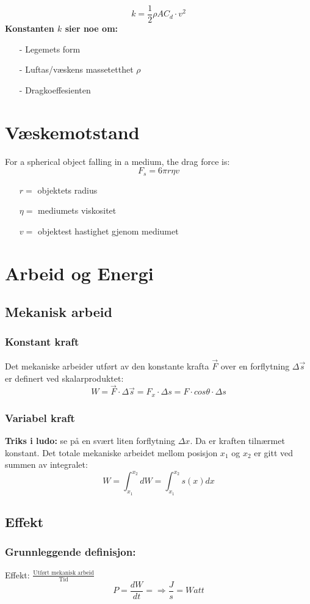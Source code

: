 \documentclass[12pt]{article}
\begin{document}
\bigskip
$$k = \frac{1}{2}\rho AC_d\cdot v^2$$
\textbf{Konstanten $k$ sier noe om:}
\begin{itemize}
    \item[-] Legemets form
    \item[-] Luftas/væskens massetetthet $\rho$
    \item[-] Dragkoeffesienten %
\end{itemize}

\section{Væskemotstand}
For a spherical object falling in a medium, the drag force is:
$$F_s = 6\pi r\eta v$$
\begin{itemize}
    \item[] $r =$ objektets radius
    \item[] $\eta =$ mediumets viskositet
    \item[] $v =$ objektest hastighet gjenom mediumet
\end{itemize}

\section{Arbeid og Energi}
\subsection{Mekanisk arbeid}
\subsubsection{Konstant kraft}
Det mekaniske arbeider utført av den konstante krafta $\Vec{F}$ over en forflytning $\Delta\Vec{s}$ er definert ved skalarproduktet:
$$W = \Vec{F} \cdot \Delta\Vec{s} = F_x \cdot \Delta s = F \cdot cos\theta \cdot\Delta s$$
%
\subsubsection{Variabel kraft}
\textbf{Triks i ludo:} se på en svært liten forflytning $\Delta x$. Da er kraften tilnærmet konstant.
Det totale mekaniske arbeidet mellom posisjon $x_1$ og $x_2$ er gitt ved summen av integralet:
$$W = \int_{x_1}^{x_2} dW = \int_{x_1}^{x_2} s(x) dx $$
%
\subsection{Effekt}
\subsubsection{Grunnleggende definisjon:} 
Effekt: $\frac{\text{Utført mekanisk arbeid}}{\text{Tid}}$
$$P = \frac{dW}{dt} = \Rightarrow \frac{J}{s} = Watt$$
\end{document}
